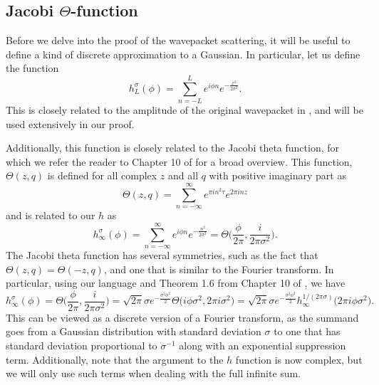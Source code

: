 \documentclass[../thesis-main/thesis-main]{subfiles}
\begin{document}
\subsection{Jacobi $\Theta$-function}

Before we delve into the proof of the wavepacket scattering, it will be useful to define a kind of discrete approximation to a Gaussian.  In particular, let us define the function
\begin{equation}
  h_L^\sigma(\phi) = \sum_{n = -L}^L e^{i \phi n} e^{-\frac{ x^2}{2\sigma^2}}. 
  \label{eq:h_L_defn}
\end{equation}
This is closely related to the amplitude of the original wavepacket in , and will be used extensively in our proof.

Additionally, this function is closely related to the Jacobi theta function, for which we refer the reader to Chapter 10 of \cite{SSCA} for a broad overview.  This function, $\Theta(z,q)$ is defined for all complex $z$ and all $q$ with positive imaginary part as
\begin{equation}
  \Theta(z,q) = \sum_{n = -\infty}^\infty e^{ \pi i n^2 \tau} e^{ 2\pi  i n z}
\end{equation}
 and is related to our $h$ as 
\begin{equation}
  h_{\infty}^\sigma(\phi) = \sum_{n = -\infty}^\infty e^{ i \phi n} e^{ - \frac{ n^2}{2\sigma^2}} = \Theta\Bigg(\frac{\phi}{2\pi}, \frac{i}{2\pi \sigma^2} \Bigg).
\end{equation}
The Jacobi theta function has several symmetries, such as the fact that $\Theta(z,q) = \Theta(-z, q)$, and one that is similar to the Fourier transform.  In particular, using our language and Theorem 1.6 from Chapter 10 of \cite{SSCA}, we have
\begin{equation}
  h_{\infty}^\sigma (\phi) = \Theta\Bigg(\frac{\phi}{2\pi}, \frac{i}{2\pi \sigma^2} \Bigg) = \sqrt{2\pi} \sigma e^{ - \frac{\sigma^2\phi^2}{2}} \Theta \big(i \phi\sigma^2, 2\pi i \sigma^2 \big) =  \sqrt{2\pi} \sigma e^{ - \frac{\sigma^2\phi^2}{2}}  h_{\infty}^{1/(2\pi \sigma)}\big(2\pi i \phi \sigma^2 \big).
  \label{eq:discrete_fourier_transform}
\end{equation}
This can be viewed as a discrete version of a Fourier transform, as the summand goes from a Gaussian distribution with standard deviation $\sigma$ to one that has standard deviation proportional to $\sigma^{-1}$ along with an exponential suppression term.  Additionally, note that the argument to the $h$ function is now complex, but we will only use such terms when dealing with the full infinite sum.
\end{document}
